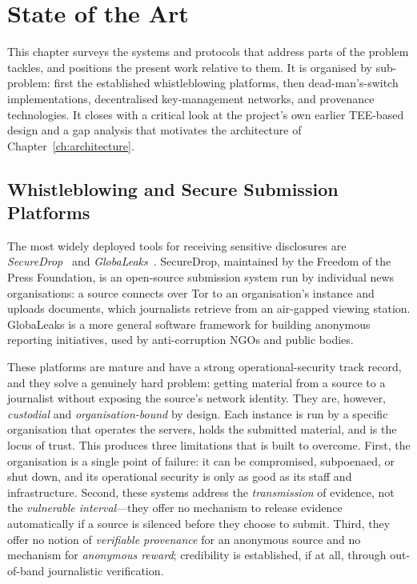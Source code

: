 \chapter{State of the Art}
\label{ch:related}

This chapter surveys the systems and protocols that address parts of the problem
\zkw tackles, and positions the present work relative to them. It is organised by
sub-problem: first the established whistleblowing platforms, then dead-man's-switch
implementations, decentralised key-management networks, and provenance
technologies. It closes with a critical look at the project's own earlier
TEE-based design and a gap analysis that motivates the architecture of
Chapter~\ref{ch:architecture}.

\section{Whistleblowing and Secure Submission Platforms}
\label{sec:rel-platforms}

The most widely deployed tools for receiving sensitive disclosures are
\emph{SecureDrop}~\cite{securedrop} and \emph{GlobaLeaks}~\cite{globaleaks}.
SecureDrop, maintained by the Freedom of the Press Foundation, is an open-source
submission system run by individual news organisations: a source connects over
Tor to an organisation's instance and uploads documents, which journalists
retrieve from an air-gapped viewing station. GlobaLeaks is a more general
software framework for building anonymous reporting initiatives, used by
anti-corruption NGOs and public bodies.

These platforms are mature and have a strong operational-security track record,
and they solve a genuinely hard problem: getting material from a source to a
journalist without exposing the source's network identity. They are, however,
\emph{custodial} and \emph{organisation-bound} by design. Each instance is run by
a specific organisation that operates the servers, holds the submitted material,
and is the locus of trust. This produces three limitations that \zkw is built to
overcome. First, the organisation is a single point of failure: it can be
compromised, subpoenaed, or shut down, and its operational security is only as
good as its staff and infrastructure. Second, these systems address the
\emph{transmission} of evidence, not the \emph{vulnerable interval}---they offer
no mechanism to release evidence automatically if a source is silenced before
they choose to submit. Third, they offer no notion of \emph{verifiable
provenance} for an anonymous source and no mechanism for \emph{anonymous reward};
credibility is established, if at all, through out-of-band journalistic
verification.

